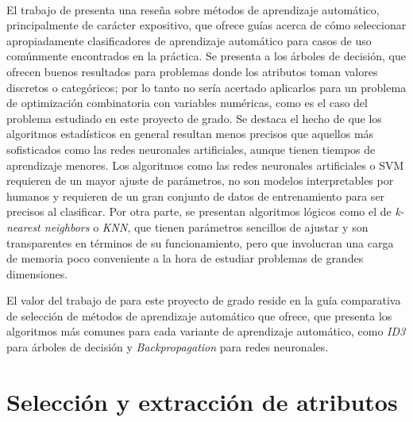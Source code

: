 \paragraph{}El trabajo de \citet{ml-survey} presenta una reseña sobre métodos de aprendizaje automático, principalmente de carácter expositivo, que ofrece guías acerca de cómo seleccionar apropiadamente clasificadores de aprendizaje automático para casos de uso comúnmente encontrados en la práctica.
Se presenta a los árboles de decisión, que ofrecen buenos resultados para problemas donde los atributos toman valores discretos o categóricos; por lo tanto no sería acertado aplicarlos para un problema de optimización combinatoria con variables numéricas, como es el caso del problema estudiado en este proyecto de grado.
Se destaca el hecho de que los algoritmos estadísticos en general resultan menos precisos que aquellos más sofisticados como las redes neuronales artificiales, aunque tienen tiempos de aprendizaje menores.
Los algoritmos como las redes neuronales artificiales o SVM requieren de un mayor ajuste de parámetros, no son modelos interpretables por humanos y requieren de un gran conjunto de datos de entrenamiento para ser precisos al clasificar.
Por otra parte, se presentan algoritmos lógicos como el de \textit{k-nearest neighbors} o \textit{KNN}, que tienen parámetros sencillos de ajustar y son transparentes en términos de su funcionamiento, pero que involucran una carga de memoria poco conveniente a la hora de estudiar problemas de grandes dimensiones.

\newpage %

El valor del trabajo de \citet{ml-survey} para este proyecto de grado reside en la guía comparativa de selección de métodos de aprendizaje automático que ofrece, que presenta los algoritmos más comunes para cada variante de aprendizaje automático, como \textit{ID3} para árboles de decisión y \textit{Backpropagation} para redes neuronales.


\section{Selección y extracción de atributos} \label{section-trabajos-seleccion-extraccion-atributos}

